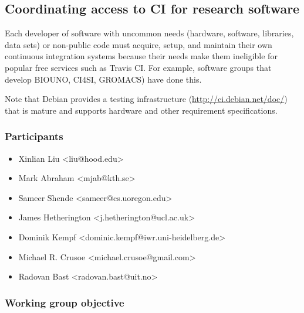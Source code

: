 \subsection{Coordinating access to CI for research software}
\label{sec:access}


Each developer of software with uncommon needs (hardware, software, libraries, data sets) or non-public code must acquire, setup, and maintain their own continuous integration systems because their needs make them ineligible for popular free services such as Travis CI.  For example, software groups that develop BIOUNO, CI4SI, GROMACS) have done this.  

Note that Debian provides a testing infrastructure (\href{https://ci.debian.net/doc/}{http://ci.debian.net/doc/}) that is mature and supports hardware and other requirement specifications. 



\subsubsection{Participants}

\begin{itemize}
  \item Xinlian Liu <liu@hood.edu>
  \item Mark Abraham <mjab@kth.se>
  \item Sameer Shende <sameer@cs.uoregon.edu>
  \item James Hetherington <j.hetherington@ucl.ac.uk>
  \item Dominik Kempf <dominic.kempf@iwr.uni-heidelberg.de>
  \item Michael R. Crusoe <michael.crusoe@gmail.com>
  \item Radovan Bast <radovan.bast@uit.no>
\end{itemize}

\subsubsection{Working group objective}

